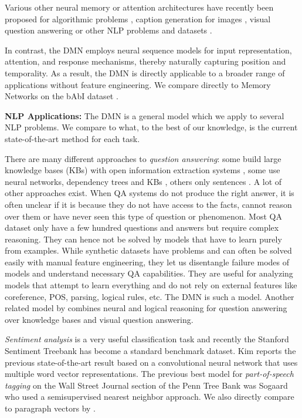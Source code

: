 \documentclass{article}
\begin{document}
Various other neural memory or attention architectures have recently been proposed for algorithmic problems \cite{Joulin2015,Kaiser2015}, caption generation for images \cite{Malinowski2014,Chen2014}, visual question answering \cite{yang2015stacked} or other NLP problems and datasets \cite{Hermann2015}.

In contrast, the DMN employs neural sequence models for input representation, attention, and response mechanisms, thereby naturally capturing position and temporality. As a result, the DMN is directly applicable to a broader range of applications without feature engineering.
We compare directly to Memory Networks on the bAbI dataset \cite{Weston2015ToyTasks}. 

\textbf{NLP Applications:} 
The DMN is a general model which we apply to several NLP problems. We compare to what, to the best of our knowledge, is the current state-of-the-art method for each task. 

There are many different approaches to \emph{question answering}: some build large knowledge bases (KBs) with open information extraction systems \cite{Yates2007}, some use neural networks, dependency trees and KBs \cite{Bordes2012}, others only sentences \cite{Iyyer2014}. A lot of other approaches exist. 
When QA systems do not produce the right answer, it is often unclear if it is because they do not have access to the facts, cannot reason over them or have never seen this type of question or phenomenon. Most QA dataset only have a few hundred questions and answers but require complex reasoning. They can hence not be solved by models that have to learn purely from examples. 
While synthetic datasets \cite{Weston2015ToyTasks} have problems and can often be solved easily with manual feature engineering, they let us disentangle failure modes of models and understand necessary QA capabilities. They are useful for analyzing models that attempt to learn everything and do not rely on external features like coreference, POS, parsing, logical rules, etc. The DMN is such a model.
Another related model by \citet{andreas2016learning} combines neural and logical reasoning for question answering over knowledge bases and visual question answering. 

\emph{Sentiment analysis} is a very useful classification task and recently the Stanford Sentiment Treebank \cite{Socher2013EMNLP} has become a standard benchmark dataset. Kim \cite{Kim2014} reports the previous state-of-the-art result based on a convolutional neural network that uses multiple word vector representations.
The previous best model for \emph{part-of-speech tagging} on the Wall Street Journal section of the Penn Tree Bank \cite{Marcus1993} was Sogaard \cite{Sogaard2011} who used a semisupervised nearest neighbor approach. We also directly compare to paragraph vectors by \cite{Le2014}.
\end{document}
